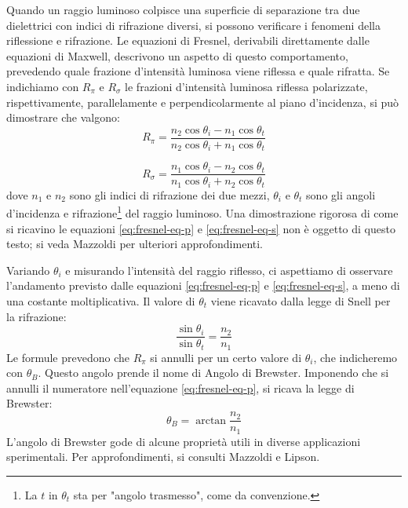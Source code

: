 Quando un raggio luminoso colpisce una superficie di separazione tra due
dielettrici con indici di rifrazione diversi, si possono verificare
i fenomeni della riflessione e rifrazione.
Le equazioni di Fresnel, derivabili direttamente dalle equazioni di Maxwell,
descrivono un aspetto di questo comportamento, prevedendo quale frazione d'intensità
luminosa viene riflessa e quale rifratta. Se indichiamo con $R_\pi$ e $R_\sigma$ le
frazioni d'intensità luminosa riflessa polarizzate, rispettivamente, parallelamente
e perpendicolarmente al piano d'incidenza, si può dimostrare che valgono:
%
\begin{equation}
  R_\pi = \frac {
    n_2 \cos{\theta_i} - n_1 \cos{\theta_t}
  } {
    n_2 \cos{\theta_i} + n_1 \cos{\theta_t}
  }\label{eq:fresnel-eq-p}
\end{equation}

\begin{equation}
  R_\sigma = \frac {
    n_1 \cos{\theta_i} - n_2 \cos{\theta_t}
  } {
    n_1 \cos{\theta_i} + n_2 \cos{\theta_t}
  }\label{eq:fresnel-eq-s}
\end{equation}
%
\noindent dove $n_1$ e $n_2$ sono gli indici di rifrazione dei due mezzi, $\theta_i$ e
$\theta_t$ sono gli angoli d'incidenza e rifrazione\footnote{La $t$ in $\theta_t$ sta per "angolo trasmesso", come da convenzione.} del raggio luminoso.
Una dimostrazione rigorosa di come si ricavino le equazioni \eqref{eq:fresnel-eq-p} e \eqref{eq:fresnel-eq-s} non è oggetto
di questo testo;
si veda Mazzoldi\cite{mazzoldi98} per ulteriori approfondimenti.

Variando $\theta_i$ e misurando l’intensità del raggio riflesso,
ci aspettiamo di osservare l'andamento previsto dalle equazioni \eqref{eq:fresnel-eq-p} e \eqref{eq:fresnel-eq-s}, a meno di una
costante moltiplicativa.
Il valore di $\theta_t$ viene ricavato dalla legge di Snell per la rifrazione:
%
\begin{equation}
  \frac {\sin{\theta_i}} {\sin{\theta_t}} = \frac {n_2} {n_1}
  \label{eq:legge-snell}
\end{equation}
%
\noindent Le formule prevedono che $R_\pi$ si annulli per un certo valore di $\theta_i$,
che indicheremo con $\theta_B$.
Questo angolo prende il nome di Angolo di Brewster. Imponendo che si annulli il
numeratore nell'equazione \eqref{eq:fresnel-eq-p}, si ricava la legge di Brewster:
%
\begin{equation}
  \theta_B = \arctan{
    \frac {n_2} {n_1}
  }\label{eq:legge-brewster}
\end{equation}
%
\noindent  L’angolo di Brewster gode di alcune proprietà utili in diverse applicazioni
sperimentali.
Per approfondimenti, si consulti Mazzoldi\cite{mazzoldi98} e Lipson\cite{lipson20}.
\endinput
